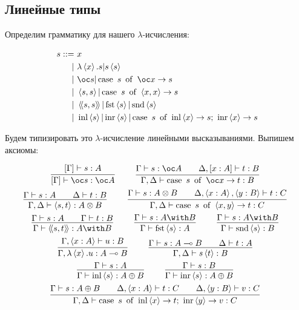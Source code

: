 \subsection{\texorpdfstring{Линейные типы}{Linear types}}

Определим грамматику для нашего $\lambda$-исчисления:
\begin{bnf}
\begin{alignat*}{2}
	s ::= &\ x \\
			  | &\ \lambda\pair{x}.s | s\pair{s} \\
			  | &\ \oc s | \caseb{s}{\oc x \to s} \\
			  | &\ \pair{s,s} | \caseb{s}{\pair{x,x} \to s} \\
			  | &\ \ppair{s,s} | \fst \pair{s} | \snd \pair{s} \\
			  | &\ \inl \pair{s} | \inr \pair{s}|
                    \casec{s}{\inl \pair{x} \to s}{\inr \pair{x} \to s}
\end{alignat*}
\end{bnf}
Будем типизировать это $\lambda$-исчисление линейными высказываниями. Выпишем аксиомы:
\begin{@empty}
\inferspacing
\begin{gather*}
	\infer[]
		{[\Gamma]\vdash \oc s : \oc A}
		{[\Gamma]\vdash s : A} \qquad
	\infer[]
		{\Gamma, \Delta\vdash \caseb{s}{\oc x \to t} : B}
		{\Gamma\vdash s : \oc A && \Delta, [x : A]\vdash t : B} \\
	\infer[]
		{\Gamma, \Delta\vdash \pair{s, t} : A \otimes B}
		{\Gamma \vdash s : A && \Delta\vdash t : B} \qquad
	\infer[]
		{\Gamma, \Delta \vdash \caseb{s}{\pair{x, y} \to t} : C}
		{\Gamma\vdash s : A \otimes B && \Delta, \pair{x : A}, \pair{y : B} \vdash t : C} \\
	\infer[]{\Gamma \vdash \ppair{s, t} : A \with B}{\Gamma \vdash s : A && \Gamma \vdash t : B} \qquad
	\infer[]{\Gamma \vdash \fst \pair{s} : A}{\Gamma \vdash s : A \with B} \qquad
	\infer[]{\Gamma \vdash \snd \pair{s} : B}{\Gamma \vdash s : A \with B} \\
	\infer[]{\Gamma, \lambda\pair{x}.u : A \multimap B}{\Gamma, \pair{x : A} \vdash u : B} \qquad
	\infer[]{\Gamma, \Delta \vdash  s \pair{t} : B}{\Gamma \vdash s : A \multimap B && \Delta \vdash t : A} \\
	\infer[]{\Gamma \vdash \inl \pair{s} : A \oplus B}{\Gamma \vdash s : A} \qquad
	\infer[]{\Gamma \vdash \inr \pair{s} : A \oplus B}{\Gamma \vdash s : B} \\
	\infer[]
		{\Gamma, \Delta \vdash \casec{s}{\inl \pair{x} \to t}{\inr \pair{y} \to v} : C}
		{\Gamma \vdash s : A \oplus B && \Delta, \pair{x : A} \vdash t : C && \Delta, \pair{y : B} \vdash v : C}
\end{gather*}
\end{@empty}

